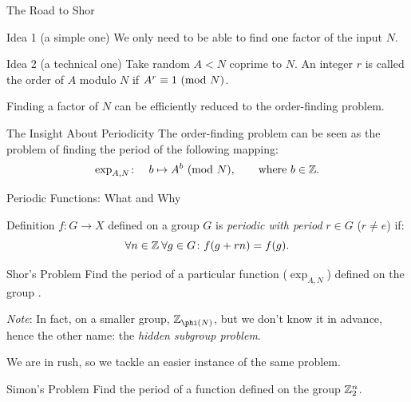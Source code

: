 \documentclass[
handout,
ignorenonframetext,hyperref={pdftex,unicode},xcolor=dvipsnames]{beamer}
\begin{document}
\begin{frame}{The Road to Shor}

  \pause
  \begin{block}{Idea 1 (a simple one)}
    We only need to be able to find one factor of the input $N$.
  \end{block}

  \pause
  \begin{block}{Idea 2 (a technical one)}
    Take random $A < N$ coprime to $N$. An integer $r$ is called the 
    \alert{order} of $A$ modulo $N$ if
    $A^r \equiv 1 \ (\mathrm{mod}\ N)$.
    
    \pause
    Finding a factor of $N$ can be efficiently reduced to the 
    order-finding problem.
  \end{block}

  \pause
  \begin{block}{The Insight About Periodicity}
    The order-finding problem can be seen as the problem of finding the
    period of the following mapping:
    \[
      \exp_{A,N}\colon \quad b \mapsto A^b \ (\mathrm{mod}\ N), \qquad \text{where } b\in\mathbb Z.
    \]
  \end{block}

\end{frame}

\begin{frame}{Periodic Functions: What and Why}

  \begin{block}{Definition}
    $f\colon G \to X$ defined on a group $G$ 
    is \emph{periodic with period} $r\in G$ ($r\neq e$) if:
    \[
       \forall n\in\mathbb Z\: \forall g\in G\colon f(g+rn) = f(g).
    \]
  \end{block}

  \pause
  \begin{block}{Shor's Problem}
    Find the period of a particular function ($\exp_{A,N}$) defined on the group \Z.
    
    {\small\emph{Note}: In fact, on a smaller group, $\Z_{\phi(N)}$, but we don't 
    know it in advance, hence the other name: the \emph{hidden subgroup problem}.}
  \end{block}

  \pause
  We are in rush, so we tackle an easier instance of the same problem.
  \begin{block}{Simon's Problem}
    Find the period of a function defined on the group $\mathbb Z^n_2$.    
  \end{block}

\end{frame}
\end{document}

